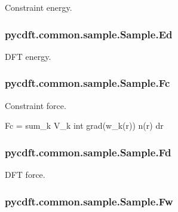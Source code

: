 Constraint energy. 

\hypertarget{classpycdft_1_1common_1_1sample_1_1Sample_a7c57a72c49ebae1ee29cc4200ab11759}{
\subsubsection[{Ed}]{\setlength{\rightskip}{0pt plus 5cm}pycdft.\-common.\-sample.\-Sample.\-Ed}}\label{classpycdft_1_1common_1_1sample_1_1Sample_a7c57a72c49ebae1ee29cc4200ab11759}


D\-F\-T energy. 

\hypertarget{classpycdft_1_1common_1_1sample_1_1Sample_aa56b18544b43f113beaa5ecc028f336a}{
\subsubsection[{Fc}]{\setlength{\rightskip}{0pt plus 5cm}pycdft.\-common.\-sample.\-Sample.\-Fc}}\label{classpycdft_1_1common_1_1sample_1_1Sample_aa56b18544b43f113beaa5ecc028f336a}


Constraint force. 

Fc = sum\-\_\-k V\-\_\-k int grad(w\-\_\-k(r)) n(r) dr \hypertarget{classpycdft_1_1common_1_1sample_1_1Sample_a5dba3318898997d2255410be439f21a3}{
\subsubsection[{Fd}]{\setlength{\rightskip}{0pt plus 5cm}pycdft.\-common.\-sample.\-Sample.\-Fd}}\label{classpycdft_1_1common_1_1sample_1_1Sample_a5dba3318898997d2255410be439f21a3}


D\-F\-T force. 

\hypertarget{classpycdft_1_1common_1_1sample_1_1Sample_ab27c15d83155fe029005efaa0de49951}{
\subsubsection[{Fw}]{\setlength{\rightskip}{0pt plus 5cm}pycdft.\-common.\-sample.\-Sample.\-Fw}}\label{classpycdft_1_1common_1_1sample_1_1Sample_ab27c15d83155fe029005efaa0de49951}


